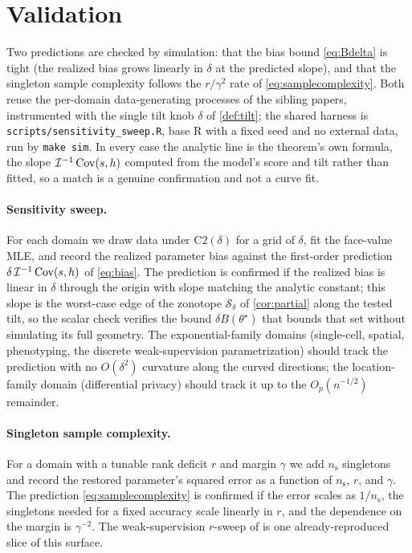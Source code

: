\section{Validation}
\label{sec:validation}

Two predictions are checked by simulation: that the bias bound \eqref{eq:Bdelta}
is tight (the realized bias grows linearly in $\delta$ at the predicted slope), and
that the singleton sample complexity follows the $r/\gamma^2$ rate of
\eqref{eq:samplecomplexity}. Both reuse the per-domain data-generating processes of
the sibling papers, instrumented with the single tilt knob $\delta$ of
\cref{def:tilt}; the shared harness is \texttt{scripts/sensitivity\_sweep.R},
base R with a fixed seed and no external data, run by \texttt{make sim}. In every
case the analytic line is the theorem's own formula, the slope
$\mathcal{I}^{-1}\operatorname{Cov}(s, h)$ computed from the model's score and tilt rather than fitted,
so a match is a genuine confirmation and not a curve fit.

\paragraph{Sensitivity sweep.} For each domain we draw data under
$\mathrm{C2}(\delta)$ for a grid of $\delta$, fit the face-value MLE, and record the
realized parameter bias against the first-order prediction $\delta\,
\mathcal{I}^{-1}\operatorname{Cov}(s, h)$ of \eqref{eq:bias}. The prediction is confirmed if the
realized bias is linear in $\delta$ through the origin with slope matching the
analytic constant; this slope is the worst-case edge of the zonotope
$\mathcal{S}_\delta$ of \cref{cor:partial} along the tested tilt, so the scalar check
verifies the bound $\delta B(\theta^\star)$ that bounds that set without simulating
its full geometry. The exponential-family domains (single-cell, spatial,
phenotyping, the discrete weak-supervision parametrization) should track the
prediction with no $O(\delta^2)$ curvature along the curved directions; the
location-family domain (differential privacy) should track it up to the
$O_p(n^{-1/2})$ remainder.

\paragraph{Singleton sample complexity.} For a domain with a tunable rank deficit
$r$ and margin $\gamma$ we add $n_{\mathrm{s}}$ singletons and record the restored
parameter's squared error as a function of $n_{\mathrm{s}}$, $r$, and $\gamma$. The
prediction \eqref{eq:samplecomplexity} is confirmed if the error scales as
$1/n_{\mathrm{s}}$, the singletons needed for a fixed accuracy scale linearly in
$r$, and the dependence on the margin is $\gamma^{-2}$. The weak-supervision
$r$-sweep of \citet{towell2026weaksupcoarsening} is one already-reproduced slice of
this surface.


